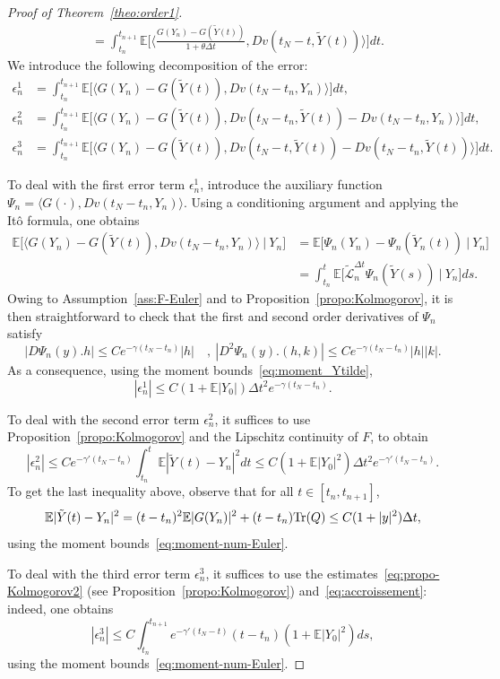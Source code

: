 \documentclass[11pt]{amsart}
\newcommand{\E}{\mathbb{E}}
\begin{document}
\begin{proof}[Proof of Theorem~\ref{theo:order1}]
\begin{align*}
&=\int_{t_n}^{t_{n+1}}\E\bigl[\langle \frac{G(Y_n)-G(\tilde{Y}(t))}{1+\theta\Delta t},Dv(t_N-t,\tilde{Y}(t))\rangle\bigr]dt.
\end{align*}
We introduce the following decomposition of the error:
\begin{align*}
\epsilon_n^{1}&=\int_{t_n}^{t_{n+1}}\E\bigl[\langle G(Y_n)-G(\tilde{Y}(t)),Dv(t_N-t_n,Y_n)\rangle\bigr]dt,\\
\epsilon_n^{2}&=\int_{t_n}^{t_{n+1}}\E\bigl[\langle G(Y_n)-G(\tilde{Y}(t)),Dv(t_N-t_n,\tilde{Y}(t))-Dv(t_N-t_n,Y_n)\rangle\bigr]dt,\\
\epsilon_n^{3}&=\int_{t_n}^{t_{n+1}}\E\bigl[\langle G(Y_n)-G(\tilde{Y}(t)),Dv(t_N-t,\tilde{Y}(t))-Dv(t_N-t_n,\tilde{Y}(t))\rangle\bigr]dt.
\end{align*}

To deal with the first error term $\epsilon_n^{1}$, introduce the auxiliary function $\Psi_n=\langle G(\cdot),Dv(t_N-t_n,Y_n)\rangle$. Using a conditioning argument and applying the It\^o formula, one obtains
\begin{align*}
\E\bigl[\langle G(Y_n)-G(\tilde{Y}(t)),Dv(t_N-t_n,Y_n)\rangle~\big|~Y_n\bigr]&=\E\bigl[\Psi_n(Y_n)-\Psi_n(\tilde{Y}_n(t))~\big|~Y_n\bigr]\\
&=\int_{t_n}^{t}\E\bigl[\tilde{\mathcal{L}}_n^{\Delta t}\Psi_n(\tilde{Y}(s))~\big|~Y_n\bigr]ds.
\end{align*}
Owing to Assumption~\ref{ass:F-Euler} and to Proposition~\ref{propo:Kolmogorov}, it is then straightforward to check that the first and second order derivatives of $\Psi_n$ satisfy
\[
|D\Psi_n(y).h|\le Ce^{-\gamma(t_N-t_n)}|h|\quad,~|D^2\Psi_n(y).(h,k)|\le Ce^{-\gamma(t_N-t_n)}|h||k|.
\]
As a consequence, using the moment bounds~\eqref{eq:moment_Ytilde},
\[
|\epsilon_n^{1}|\le C(1+\E|Y_0|)\Delta t^2e^{-\gamma(t_N-t_n)}.
\]

To deal with the second error term $\epsilon_{n}^{2}$, it suffices to use Proposition~\ref{propo:Kolmogorov} and the Lipschitz continuity of $F$, to obtain
\[
|\epsilon_n^{2}|\le Ce^{-\gamma'(t_N-t_n)}\int_{t_n}^{t}\E|\tilde{Y}(t)-Y_n|^2dt\le C(1+\E|Y_0|^2)\Delta t^2e^{-\gamma'(t_N-t_n)}.
\]
To get the last inequality above, observe that for all $t\in[t_n,t_{n+1}]$,
\begin{equation}\label{eq:accroissement}
\E|\tilde{Y}(t)-Y_n|^2=(t-t_n)^2\E|G(Y_n)|^2+(t-t_n){\rm Tr}(Q) \le C(1+|y|^2)\Delta t,
\end{equation}
using the moment bounds~\eqref{eq:moment-num-Euler}.

To deal with the third error term $\epsilon_n^{3}$, it suffices to use the estimates~\eqref{eq:propo-Kolmogorov2} (see Proposition~\ref{propo:Kolmogorov}) and~\eqref{eq:accroissement}: indeed, one obtains
\[
|\epsilon_n^{3}|\le C\int_{t_n}^{t_{n+1}}e^{-\gamma'(t_N-t)}(t-t_n)(1+\E|Y_0|^2)ds,
\]
using the moment bounds~\eqref{eq:moment-num-Euler}.



\end{proof}
\end{document}
